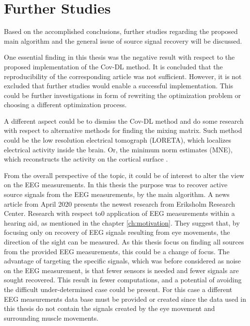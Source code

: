 \chapter{Further Studies}
Based on the accomplished conclusions, further studies regarding the proposed main algorithm and the general issue of source signal recovery will be discussed.

One essential finding in this thesis was the negative result with respect to the proposed implementation of the Cov-DL method. It is concluded that the reproducibility of the corresponding article was not sufficient. However, it is not excluded that further studies would enable a successful implementation. 
This could be further investigations in form of rewriting the optimization problem or choosing a different optimization process. 

A different aspect could be to dismiss the Cov-DL method and do some research with respect to alternative methods for finding the mixing matrix. 
Such method could be the low resolution electrical tomograph (LORETA), which localizes electrical activity inside the brain. Or, the minimum norm estimates (MNE), which reconstructs the activity on the cortical surface \cite{LORETA}.

From the overall perspective of the topic, it could be of interest to alter the view on the EEG measurements. In this thesis the purpose was to recover active source signals from the EEG measurements, by the main algorithm. 
A news article from April 2020 \cite{Ing2020} presents the newest research from Eriksholm Research Center.  Research with respect to0 application of EEG measurements within a hearing aid, as mentioned in the chapter \ref{ch:motivation}. They suggest that, by focusing only on recovery of EEG signals resulting from eye movements, the direction of the sight can be measured. 
As this thesis focus on finding all sources from the provided EEG measurements, this could be a change of focus. The advantage of targeting the specific signals, which was before considered as noise on the EEG measurement, is that fewer sensors is needed and fewer signals are sought recovered. This result in fewer computations, and a potential of avoiding the difficult under-determined case could be present. 
For this case a different EEG measurements data base must be provided or created since the data used in this thesis do not contain the signals created by the eye movement and surrounding muscle movements.

